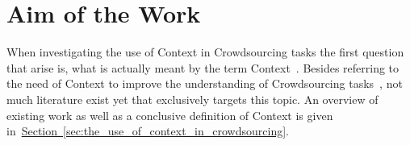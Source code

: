 \section{Aim of the Work}
When investigating the use of Context in Crowdsourcing tasks the first question that arise is, what is actually
meant by the term \guillemotright Context\guillemotleft~. Besides referring to the need of Context to improve the understanding
of Crowdsourcing tasks~\cite{sarasua2015crowdsourcing}, not much literature exist yet that exclusively targets this topic. An overview
of existing work as well as a conclusive definition of Context is given in~\hyperref[sec:the_use_of_context_in_crowdsourcing]{Section~\ref*{sec:the_use_of_context_in_crowdsourcing}}.

